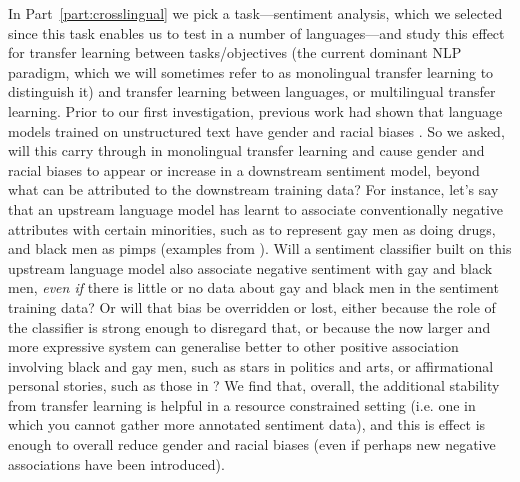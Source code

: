 In Part~\ref{part:crosslingual} we pick a task---sentiment analysis, which we selected since this task enables us to test in a number of languages---and study this effect for transfer learning between tasks/objectives (the current dominant NLP paradigm, which we will sometimes refer to as monolingual transfer learning to distinguish it) and transfer learning between languages, or multilingual transfer learning. Prior to our first investigation, previous work had shown that language models trained on unstructured text have gender and racial biases \cite{bolukbasi, Caliskan2017SemanticsDA, zhao-etal-2019-gender, zhao-etal-2020-gender, sheng-etal-2019-woman}. So we asked, will this carry through in monolingual transfer learning and cause gender and racial biases to appear or increase in a downstream sentiment model, beyond what can be attributed to the downstream training data? For instance, let's say that an upstream language model has learnt to associate conventionally negative attributes with certain minorities, such as to represent gay men as doing drugs, and black men as pimps (examples from \citet{sheng-etal-2019-woman}). Will a sentiment classifier built on this upstream language model also associate negative sentiment with gay and black men, \textit{even if} there is little or no data about gay and black men in the sentiment training data? 
Or will that bias be overridden or lost, either because the role of the classifier is strong enough to disregard that, or because the now larger and more expressive system can generalise better to other positive association involving black and gay men, such as stars in politics and arts, or affirmational personal stories, such as those in \cite{Dixon2018MeasuringAM}? We find that, overall, the additional stability from transfer learning is helpful in a resource constrained setting (i.e. one in which you cannot gather more annotated sentiment data), and this is effect is enough to overall reduce gender and racial biases (even if perhaps new negative associations have been introduced).

